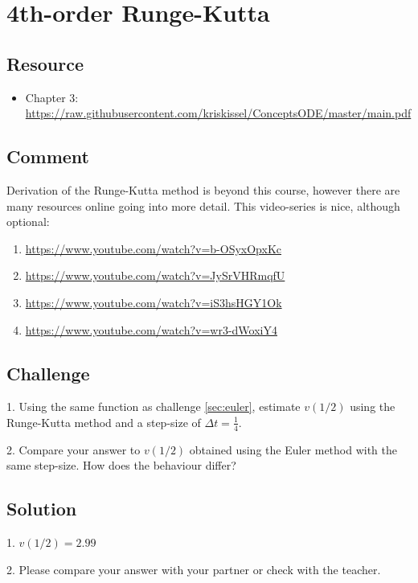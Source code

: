 \newpage
\section{4th-order Runge-Kutta}

\subsection*{Resource}
\begin{itemize}
    \item Chapter 3: \url{https://raw.githubusercontent.com/kriskissel/ConceptsODE/master/main.pdf}
\end{itemize}

\subsection*{Comment}
Derivation of the Runge-Kutta method is beyond this course, however there are many resources online going into more detail. This video-series is nice, although optional:
\begin{enumerate}
    \item \url{https://www.youtube.com/watch?v=b-OSyxOpxKc}
    \item \url{https://www.youtube.com/watch?v=JySrVHRmqfU}
    \item \url{https://www.youtube.com/watch?v=iS3hsHGY1Ok}
    \item \url{https://www.youtube.com/watch?v=wr3-dWoxiY4}
\end{enumerate}

\subsection*{Challenge}
1. Using the same function as challenge \ref{sec:euler}, estimate $v(1/2)$ using the Runge-Kutta method and a step-size of $\Delta t = \frac{1}{4}$.

2. Compare your answer to $v(1/2)$ obtained using the Euler method with the same step-size. How does the behaviour differ?

\subsection*{Solution}
1. $v(1/2) = 2.99$

2. Please compare your answer with your partner or check with the teacher.



